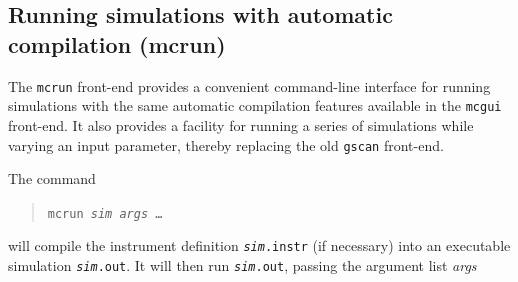 \subsection{Running simulations with automatic compilation (mcrun)}
\label{s:mcrun}

The \verb+mcrun+ front-end provides a convenient command-line
interface for running simulations with the same automatic compilation
features available in the \verb+mcgui+ front-end. It also provides a
facility for running a series of simulations while varying an input
parameter, thereby replacing the old \verb+gscan+ front-end.

The command
\begin{quote}
  \texttt{mcrun {\it sim} {\it args\/} \ldots}
\end{quote}
will compile the instrument definition \texttt{{\it sim}.instr} (if
necessary) into an executable simulation \texttt{{\it sim}.out}. It
will then run \texttt{{\it sim}.out}, passing the argument list {\it
  args}

